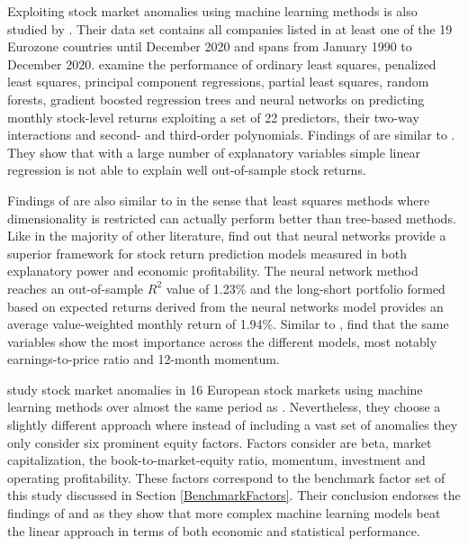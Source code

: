 \documentclass[12pt]{article}
\begin{document}
Exploiting stock market anomalies using machine learning methods is also studied by \citet{Drobetz}. Their data set contains all companies listed in at least one of the 19 Eurozone countries until December 2020 and spans from January 1990 to December 2020.\footnotemark {} \citeauthor{Drobetz} examine the performance of ordinary least squares, penalized least squares, principal component regressions, partial least squares, random forests, gradient boosted regression trees and neural networks on predicting monthly stock-level returns exploiting a set of 22 predictors, their two-way interactions and second- and third-order polynomials. Findings of \citeauthor{Drobetz} are similar to \citet{guetal}. They show that with a large number of explanatory variables simple linear regression is not able to explain well out-of-sample stock returns.\footnotemark {} \par

Findings of \citet{Drobetz} are also similar to \citet{TOBEK2021100588} in the sense that least squares methods where dimensionality is restricted can actually perform better than tree-based methods. Like in the majority of other literature, \citeauthor{Drobetz} find out that neural networks provide a superior framework for stock return prediction models measured in both explanatory power and economic profitability. The neural network method reaches an out-of-sample $R^{2}$ value of 1.23\% and the long-short portfolio formed based on expected returns derived from the neural networks model provides an average value-weighted monthly return of 1.94\%.\footnotemark {} Similar to \citet{guetal}, \citeauthor{Drobetz} find that the same variables show the most importance across the different models, most notably earnings-to-price ratio and 12-month momentum.\footnotemark {} \par

\citet*{Fieberg} study stock market anomalies in 16 European stock markets using machine learning methods over almost the same period as \citet{Drobetz}. Nevertheless, they choose a slightly different approach where instead of including a vast set of anomalies they only consider six prominent equity factors. Factors \citeauthor{Fieberg} consider are beta, market capitalization, the book-to-market-equity ratio, momentum, investment and operating profitability. These factors correspond to the benchmark factor set of this study discussed in Section \ref{BenchmarkFactors}. Their conclusion endorses the findings of \citet{Drobetz} and \citet{TOBEK2021100588} as they show that more complex machine learning models beat the linear approach in terms of both economic and statistical performance. \footnotemark {} \par
\end{document}
